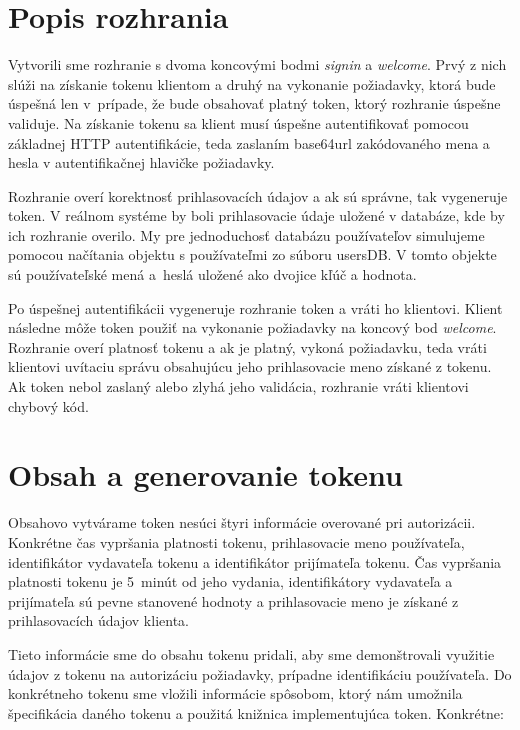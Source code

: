 \section{Popis rozhrania}

Vytvorili sme rozhranie s dvoma koncovými bodmi \textit{signin} a \textit{welcome}. Prvý z nich slúži na získanie tokenu klientom a druhý na vykonanie požiadavky, ktorá bude úspešná len v~prípade, že bude obsahovať platný token, ktorý rozhranie úspešne validuje. Na získanie tokenu sa klient musí úspešne autentifikovať pomocou základnej HTTP autentifikácie, teda zaslaním base64url \cite{base64_rfc} zakódovaného mena a hesla v autentifikačnej hlavičke požiadavky.

Rozhranie overí korektnosť prihlasovacích údajov a ak sú správne, tak vygeneruje token. V reálnom systéme by boli prihlasovacie údaje uložené v databáze, kde by ich rozhranie overilo. My pre jednoduchosť databázu používateľov simulujeme pomocou načítania objektu s používateľmi zo súboru usersDB. V tomto objekte sú používateľské mená a~heslá uložené ako dvojice kľúč a hodnota.

Po úspešnej autentifikácii vygeneruje rozhranie token a vráti ho klientovi. Klient následne môže token použiť na vykonanie požiadavky na koncový bod \textit{welcome}. Rozhranie overí platnosť tokenu a ak je platný, vykoná požiadavku, teda vráti klientovi uvítaciu správu obsahujúcu jeho prihlasovacie meno získané z tokenu. Ak token nebol zaslaný alebo zlyhá jeho validácia, rozhranie vráti klientovi chybový kód.

\section{Obsah a generovanie tokenu}
\label{sec:obsah}

Obsahovo vytvárame token nesúci štyri informácie overované pri autorizácii. Konkrétne čas vypršania platnosti tokenu, prihlasovacie meno používateľa, identifikátor vydavateľa tokenu a identifikátor prijímateľa tokenu. Čas vypršania platnosti tokenu je 5~minút od jeho vydania, identifikátory vydavateľa a prijímateľa sú pevne stanovené hodnoty a prihlasovacie meno je získané z prihlasovacích údajov klienta.

Tieto informácie sme do obsahu tokenu pridali, aby sme demonštrovali využitie údajov z tokenu na autorizáciu požiadavky, prípadne identifikáciu používateľa. Do konkrétneho tokenu sme vložili informácie spôsobom, ktorý nám umožnila špecifikácia daného tokenu a použitá knižnica implementujúca token. Konkrétne:


